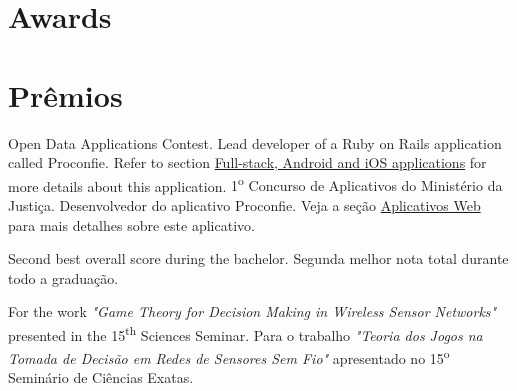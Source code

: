 {\section{Awards}\label{sec:awards}}{\section{Prêmios}\label{sec:awards}}

	{
		{Open Data Applications Contest. Lead developer of a Ruby on Rails application called Proconfie. Refer to section \hyperref[sec:web_app]{Full-stack, Android and iOS applications} for more details about this application.}
		{1\textsuperscript{o} Concurso de Aplicativos do Ministério da Justiça. Desenvolvedor do aplicativo Proconfie. Veja a seção \hyperref[sec:web_app]{Aplicativos Web} para mais detalhes sobre este aplicativo.}}

	{
		        {Second best overall score during the bachelor.}
		        {Segunda melhor nota total durante todo a graduação.}}

	{
		{For the work \emph{"Game Theory for Decision Making in Wireless Sensor Networks"} presented in the 15\textsuperscript{th} Sciences Seminar.}
		{Para o trabalho \emph{"Teoria dos Jogos na Tomada de Decisão em Redes de Sensores Sem Fio"} apresentado no 15\textsuperscript{o} Seminário de Ciências Exatas.}}



